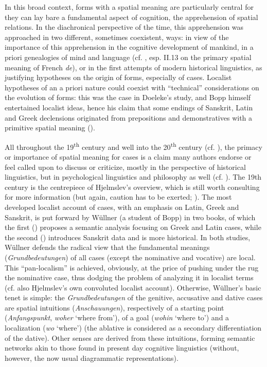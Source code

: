 \documentclass[output=paper]{langscibook}
\begin{document}
In this broad context, forms with a spatial meaning are particularly central for they can lay bare a fundamental aspect of cognition, the apprehension of spatial relations. In the diachronical perspective of the time, this apprehension was approached in two different, sometimes coexistent, ways: in view of the importance of this apprehension in the cognitive development of mankind, in a priori genealogies of mind and language (cf. \citealt{condillac_cours_1775}, esp. II.13 on the primary spatial meaning of French \textit{de}), or in the first attempts of modern historical linguistics, as justifying hypotheses on the origin of forms, especially of cases. Localist hypotheses of an a priori nature could coexist with “technical” considerations on the evolution of forms: this was the case in Doeleke’s study, and Bopp himself entertained localist ideas, hence his claim that some endings of Sanskrit, Latin and Greek declensions originated from prepositions and demonstratives with a primitive spatial meaning (\citeyear{bopp_vergleichende_1826}).

All throughout the 19\textsuperscript{th} century and well into the 20\textsuperscript{th} century (cf. \citealt{kurylowicz_inflectional_1964} ), the primacy or importance of spatial meaning for cases is a claim many authors endorse or feel called upon to discuss or criticize, mostly in the perspective of historical linguistics, but in psychological linguistics and philosophy as well (cf. \citealt{marty_logische_1910}). The 19th century is the centrepiece of Hjelmslev’s overview, which is still worth consulting for more information (but again, caution has to be exerted; \citealt{Fortis2018}). The most developed localist account of cases, with an emphasis on Latin, Greek and Sanskrit, is put forward by Wüllner (a student of Bopp) in two books, of which the first (\citealt{wullner_bedeutung_1827}) proposes a semantic analysis focusing on Greek and Latin cases, while the second (\citeyear{wullner_uber_1831}) introduces Sanskrit data and is more historical. In both studies, Wüllner defends the radical view that the fundamental meanings (\textit{Grundbedeutungen}) of all cases (except the nominative and vocative) are local. This “pan-localism” is achieved, obviously, at the price of pushing under the rug the nominative case, thus dodging the problem of analyzing it in localist terms (cf. also Hjelmslev’s own convoluted localist account). Otherwise, Wüllner’s basic tenet is simple: the \textit{Grundbedeutungen} of the genitive, accusative and dative cases are spatial intuitions (\textit{Anschauungen}), respectively of a starting point (\textit{Anfangspunkt}, \textit{woher }‘where from’), of a goal (\textit{wohin }‘where to’) and a localization (\textit{wo }‘where’) (the ablative is considered as a secondary differentiation of the dative). Other senses are derived from these intuitions, forming semantic networks akin to those found in present day cognitive linguistics (without, however, the now usual diagrammatic representations).
\end{document}
